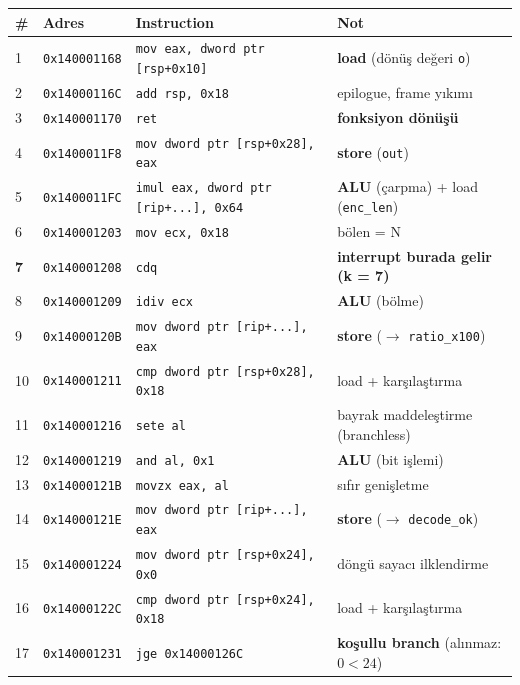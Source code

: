 \documentclass[11pt,a4paper]{article}
\newcommand{\tl}{\texttt}
\begin{document}
\begin{longtable}{p{0.7cm}p{2.3cm}p{6.5cm}p{5.1cm}}
\toprule
\textbf{\#} & \textbf{Adres} & \textbf{Instruction} & \textbf{Not}\\
\midrule
\endhead
1  & \tl{0x140001168} & \tl{mov eax, dword ptr [rsp+0x10]} & \textbf{load} (dönüş değeri \tl{o})\\
2  & \tl{0x14000116C} & \tl{add rsp, 0x18}                  & epilogue, frame yıkımı\\
3  & \tl{0x140001170} & \tl{ret}                            & \textbf{fonksiyon dönüşü}\\
4  & \tl{0x1400011F8} & \tl{mov dword ptr [rsp+0x28], eax}  & \textbf{store} (\tl{out})\\
5  & \tl{0x1400011FC} & \tl{imul eax, dword ptr [rip+...], 0x64} & \textbf{ALU} (çarpma) + load (\tl{enc\_len})\\
6  & \tl{0x140001203} & \tl{mov ecx, 0x18}                  & bölen = N\\
\textbf{7} & \tl{0x140001208} & \tl{cdq}                    & \textbf{interrupt burada gelir (k = 7)}\\
8  & \tl{0x140001209} & \tl{idiv ecx}                       & \textbf{ALU} (bölme)\\
9  & \tl{0x14000120B} & \tl{mov dword ptr [rip+...], eax}   & \textbf{store} ($\rightarrow$ \tl{ratio\_x100})\\
10 & \tl{0x140001211} & \tl{cmp dword ptr [rsp+0x28], 0x18} & load + karşılaştırma\\
11 & \tl{0x140001216} & \tl{sete al}                        & bayrak maddeleştirme (branchless)\\
12 & \tl{0x140001219} & \tl{and al, 0x1}                    & \textbf{ALU} (bit işlemi)\\
13 & \tl{0x14000121B} & \tl{movzx eax, al}                  & sıfır genişletme\\
14 & \tl{0x14000121E} & \tl{mov dword ptr [rip+...], eax}   & \textbf{store} ($\rightarrow$ \tl{decode\_ok})\\
15 & \tl{0x140001224} & \tl{mov dword ptr [rsp+0x24], 0x0}  & döngü sayacı ilklendirme\\
16 & \tl{0x14000122C} & \tl{cmp dword ptr [rsp+0x24], 0x18} & load + karşılaştırma\\
17 & \tl{0x140001231} & \tl{jge 0x14000126C}                & \textbf{koşullu branch} (alınmaz: $0 < 24$)\\
\bottomrule
\end{longtable}
\end{document}

